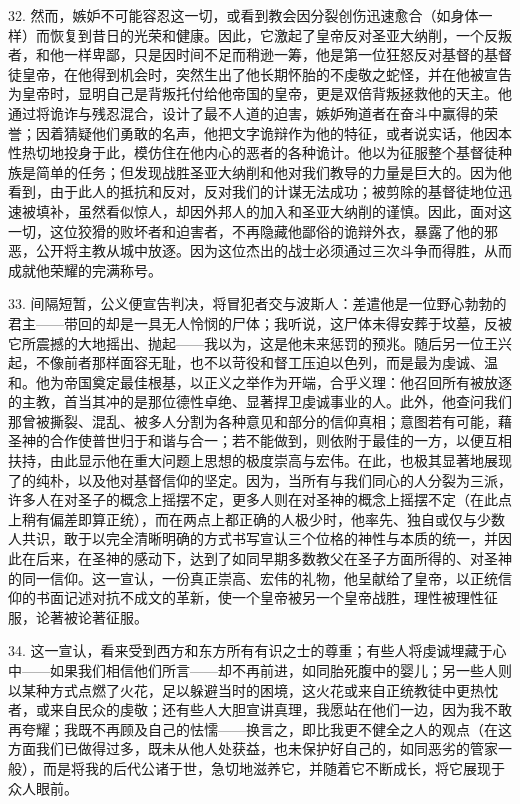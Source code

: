 32. 然而，嫉妒不可能容忍这一切，或看到教会因分裂创伤迅速愈合（如身体一样）而恢复到昔日的光荣和健康。因此，它激起了皇帝反对圣亚大纳削，一个反叛者，和他一样卑鄙，只是因时间不足而稍逊一筹，他是第一位狂怒反对基督的基督徒皇帝，在他得到机会时，突然生出了他长期怀胎的不虔敬之蛇怪，并在他被宣告为皇帝时，显明自己是背叛托付给他帝国的皇帝，更是双倍背叛拯救他的天主。他通过将诡诈与残忍混合，设计了最不人道的迫害，嫉妒殉道者在奋斗中赢得的荣誉；因着猜疑他们勇敢的名声，他把文字诡辩作为他的特征，或者说实话，他因本性热切地投身于此，模仿住在他内心的恶者的各种诡计。他以为征服整个基督徒种族是简单的任务；但发现战胜圣亚大纳削和他对我们教导的力量是巨大的。因为他看到，由于此人的抵抗和反对，反对我们的计谋无法成功；被剪除的基督徒地位迅速被填补，虽然看似惊人，却因外邦人的加入和圣亚大纳削的谨慎。因此，面对这一切，这位狡猾的败坏者和迫害者，不再隐藏他鄙俗的诡辩外衣，暴露了他的邪恶，公开将主教从城中放逐。因为这位杰出的战士必须通过三次斗争而得胜，从而成就他荣耀的完满称号。\par

33. 间隔短暂，公义便宣告判决，将冒犯者交与波斯人：差遣他是一位野心勃勃的君主——带回的却是一具无人怜悯的尸体；我听说，这尸体未得安葬于坟墓，反被它所震撼的大地摇出、抛起——我以为，这是他未来惩罚的预兆。\newline{}随后另一位王兴起，不像前者那样面容无耻，也不以苛役和督工压迫以色列，而是最为虔诚、温和。他为帝国奠定最佳根基，以正义之举作为开端，合乎义理：他召回所有被放逐的主教，首当其冲的是那位德性卓绝、显著捍卫虔诚事业的人。此外，他查问我们那曾被撕裂、混乱、被多人分割为各种意见和部分的信仰真相；意图若有可能，藉圣神的合作使普世归于和谐与合一；若不能做到，则依附于最佳的一方，以便互相扶持，由此显示他在重大问题上思想的极度崇高与宏伟。在此，也极其显著地展现了的纯朴，以及他对基督信仰的坚定。因为，当所有与我们同心的人分裂为三派，许多人在对圣子的概念上摇摆不定，更多人则在对圣神的概念上摇摆不定（在此点上稍有偏差即算正统），而在两点上都正确的人极少时，他率先、独自或仅与少数人共识，敢于以完全清晰明确的方式书写宣认三个位格的神性与本质的统一，并因此在后来，在圣神的感动下，达到了如同早期多数教父在圣子方面所得的、对圣神的同一信仰。这一宣认，一份真正崇高、宏伟的礼物，他呈献给了皇帝，以正统信仰的书面记述对抗不成文的革新，使一个皇帝被另一个皇帝战胜，理性被理性征服，论著被论著征服。\par

34. 这一宣认，看来受到西方和东方所有有识之士的尊重；有些人将虔诚埋藏于心中——如果我们相信他们所言——却不再前进，如同胎死腹中的婴儿；另一些人则以某种方式点燃了火花，足以躲避当时的困境，这火花或来自正统教徒中更热忱者，或来自民众的虔敬；还有些人大胆宣讲真理，我愿站在他们一边，因为我不敢再夸耀；我既不再顾及自己的怯懦——换言之，即比我更不健全之人的观点（在这方面我们已做得过多，既未从他人处获益，也未保护好自己的，如同恶劣的管家一般），而是将我的后代公诸于世，急切地滋养它，并随着它不断成长，将它展现于众人眼前。\par

